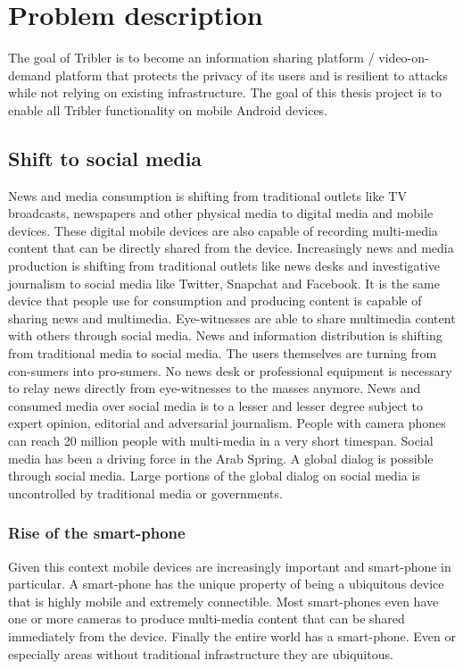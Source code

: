 \chapter{Problem description}

The goal of Tribler is to become an information sharing platform / video-on-demand platform that protects the privacy of its users and is resilient to attacks while not relying on existing infrastructure.
The goal of this thesis project is to enable all Tribler functionality on mobile Android devices.


\section{Shift to social media}
News and media consumption is shifting from traditional outlets like TV broadcasts, newspapers and other physical media to digital media and mobile devices.
These digital mobile devices are also capable of recording multi-media content that can be directly shared from the device.
Increasingly news and media production is shifting from traditional outlets like news desks and investigative journalism to social media like Twitter, Snapchat and Facebook.
It is the same device that people use for consumption and producing content is capable of sharing news and multimedia.
Eye-witnesses are able to share multimedia content with others through social media.
News and information distribution is shifting from traditional media to social media.
The users themselves are turning from con-sumers into pro-sumers.
No news desk or professional equipment is necessary to relay news directly from eye-witnesses to the masses anymore.
News and consumed media over social media is to a lesser and lesser degree subject to expert opinion, editorial and adversarial journalism. \cite{reuters_social_media}
People with camera phones can reach 20 million people with multi-media in a very short timespan.
Social media has been a driving force in the Arab Spring.
A global dialog is possible through social media.
Large portions of the global dialog on social media is uncontrolled by traditional media or governments.


\subsection{Rise of the smart-phone}
Given this context mobile devices are increasingly important and smart-phone in particular.
A smart-phone has the unique property of being a ubiquitous device that is highly mobile and extremely connectible.
Most smart-phones even have one or more cameras to produce multi-media content that can be shared immediately from the device.
Finally the entire world has a smart-phone.
Even or especially areas without traditional infrastructure they are ubiquitous.


